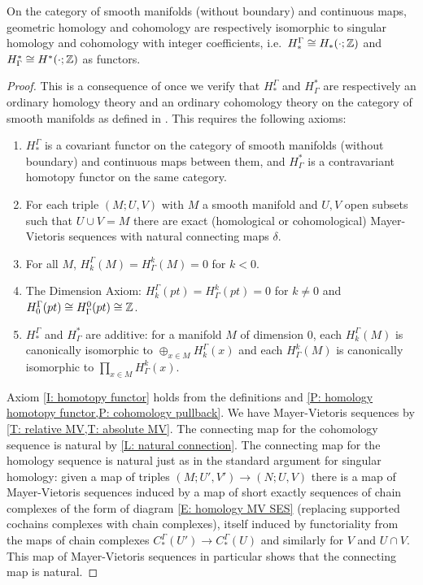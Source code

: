 \begin{theorem}\label{T: geometric is singular}
On the category of smooth manifolds (without boundary) and continuous maps, geometric homology and cohomology are respectively isomorphic to singular homology and cohomology with integer coefficients, i.e.\ $H_*^\Gamma \cong H_*(\cdot ;\mathbb{Z})$ and $H^*_\Gamma \cong H^*(\cdot ;\mathbb{Z})$ as functors.
\end{theorem}
\begin{proof}
This is a consequence of \cite[Theorem 10]{Krec10b} once we verify that $H_*^\Gamma$ and $H^*_\Gamma$ are respectively an ordinary homology theory and an ordinary cohomology theory on the category of smooth manifolds as defined in \cite{Krec10b}. This requires the following axioms:

\begin{enumerate}
\item\label{I: homotopy functor} $H_*^\Gamma$ is a covariant functor on the category of smooth manifolds (without boundary) and continuous maps between them, and $H^*_\Gamma$ is a contravariant homotopy functor on the same category.

\item For each triple $(M;U,V)$ with $M$ a smooth manifold and $U,V$ open subsets such that $U \cup V = M$ there are exact (homological or cohomological) Mayer-Vietoris sequences with natural connecting maps $\delta$.


\item\label{I: neg dim} For all $M$, $H_k^\Gamma(M) = H^k_\Gamma(M) = 0$ for $k<0$.


\item The Dimension Axiom: $H_k^\Gamma(pt) = H^k_\Gamma(pt) = 0$ for $k\neq 0$ and $H^\Gamma_0(pt) \cong H_\Gamma^0(pt) \cong \mathbb{Z}$.

\item $H_*^\Gamma$ and $H^*_\Gamma$ are additive: for a manifold $M$ of dimension $0$, each $H_k^\Gamma(M)$ is canonically isomorphic to $\oplus_{x \in M} H_k^\Gamma(x)$ and each $H^k_\Gamma(M)$ is canonically isomorphic to $\prod_{x \in M} H^k_\Gamma(x)$.
\end{enumerate}

Axiom \ref{I: homotopy functor} holds from the definitions and \cref{P: homology homotopy functor,P: cohomology pullback}.
We have Mayer-Vietoris sequences by \cref{T: relative MV,T: absolute MV}. The connecting map for the cohomology sequence is natural by \cref{L: natural connection}. The connecting map for the homology sequence is natural just as in the standard argument for singular homology: given a map of triples $(M;U',V') \to (N;U,V)$ there is a map of Mayer-Vietoris sequences induced by a map of short exactly sequences of chain complexes of the form of diagram \eqref{E: homology MV SES} (replacing supported cochains complexes with chain complexes), itself induced by functoriality from the maps of chain complexes $C_*^{\Gamma}(U') \to C_*^{\Gamma}(U)$ and similarly for $V$ and $U \cap V$. This map of Mayer-Vietoris sequences in particular shows that the connecting map is natural.



\end{proof}
